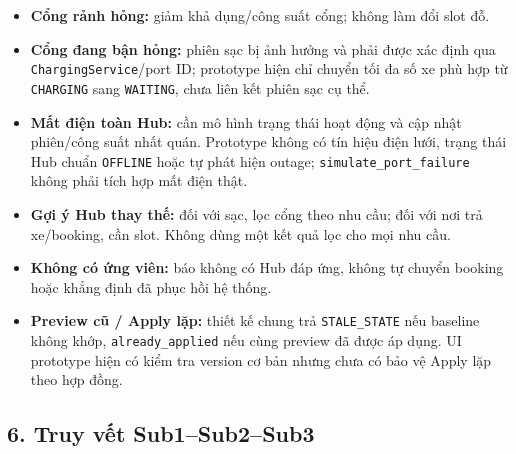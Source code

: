 \documentclass[11pt,a4paper]{article}
\providecommand{\tightlist}{%
  \setlength{\itemsep}{0pt}\setlength{\parskip}{0pt}}
\begin{document}
\begin{itemize}
\tightlist
\item
  \textbf{Cổng rảnh hỏng:} giảm khả dụng/công suất cổng; không làm đổi
  slot đỗ.
\item
  \textbf{Cổng đang bận hỏng:} phiên sạc bị ảnh hưởng và phải được xác
  định qua \texttt{ChargingService}/port ID; prototype hiện chỉ chuyển
  tối đa số xe phù hợp từ \texttt{CHARGING} sang \texttt{WAITING}, chưa
  liên kết phiên sạc cụ thể.
\item
  \textbf{Mất điện toàn Hub:} cần mô hình trạng thái hoạt động và cập
  nhật phiên/công suất nhất quán. Prototype không có tín hiệu điện lưới,
  trạng thái Hub chuẩn \texttt{OFFLINE} hoặc tự phát hiện outage;
  \texttt{simulate\_port\_failure} không phải tích hợp mất điện thật.
\item
  \textbf{Gợi ý Hub thay thế:} đối với sạc, lọc cổng theo nhu cầu; đối
  với nơi trả xe/booking, cần slot. Không dùng một kết quả lọc cho mọi
  nhu cầu.
\item
  \textbf{Không có ứng viên:} báo không có Hub đáp ứng, không tự chuyển
  booking hoặc khẳng định đã phục hồi hệ thống.
\item
  \textbf{Preview cũ / Apply lặp:} thiết kế chung trả
  \texttt{STALE\_STATE} nếu baseline không khớp,
  \texttt{already\_applied} nếu cùng preview đã được áp dụng. UI
  prototype hiện có kiểm tra version cơ bản nhưng chưa có bảo vệ Apply
  lặp theo hợp đồng.
\end{itemize}

\hypertarget{truy-vux1ebft-sub1sub2sub3}{%
\subsection{6. Truy vết
Sub1--Sub2--Sub3}\label{truy-vux1ebft-sub1sub2sub3}}
\end{document}
